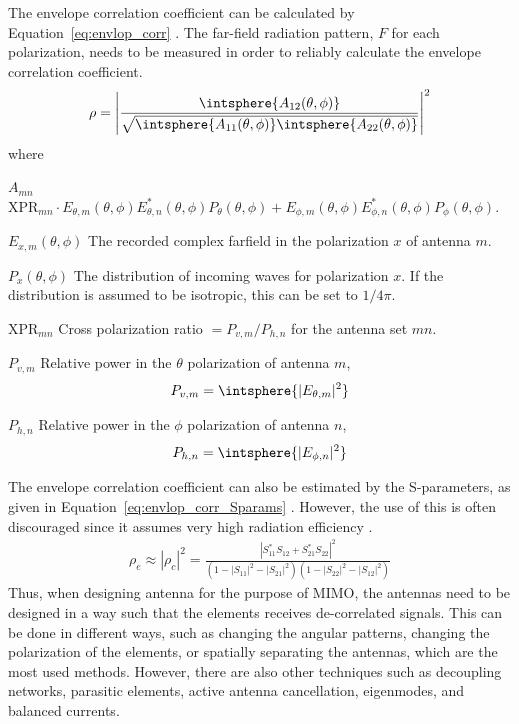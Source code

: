 The envelope correlation coefficient can be calculated by Equation~\ref{eq:envlop_corr} \cite{Wang2010}. The far-field radiation pattern, $F$ for each polarization, needs to be measured in order to reliably calculate the envelope correlation coefficient.
\begin{align} %
\label{eq:envlop_corr}
\rho = 
\left|  
%
\frac
{\intsphere{A_{12}(\theta,\phi)}}
{\sqrt{\intsphere{A_{11}(\theta,\phi)} \intsphere{A_{22}(\theta,\phi)}}}
%
\right|^2
\end{align}
where
\def\xpr{\text{XPR}}
\begin{where}
\item[$A_{mn}$]
    $
    \xpr_{mn} \cdot E_{\theta,m}(\theta,\phi) E^*_{\theta,n}(\theta,\phi) P_{\theta}(\theta,\phi)
    +
    E_{\phi,m}(\theta,\phi)E^*_{\phi,n}(\theta,\phi)P_{\phi}(\theta,\phi)
    $.
\item[$E_{x,m}(\theta,\phi)$] The recorded complex farfield in the polarization $x$ of antenna $m$.
\item[$P_x(\theta,\phi)$] The distribution of incoming waves for polarization $x$. If the distribution is assumed to be isotropic, this can be set to $1/4\pi$.
\item[$\xpr_{mn}$] Cross polarization ratio $= P_{v,m}/P_{h,n}$ for the antenna set $mn$.
\item[$P_{v,m}$] Relative power in the $\theta$ polarization of antenna $m$, 
    \begin{equation*}
        P_{v,m} = \intsphere{|E_{\theta,m}|^2}
    \end{equation*}
\item[$P_{h,n}$] Relative power in the $\phi$ polarization of antenna $n$,
    \begin{equation*}
        P_{h,n} = \intsphere{|E_{\phi,n}|^2}
    \end{equation*}
\end{where}

The envelope correlation coefficient can also be estimated by the S-parameters, as given in Equation~\ref{eq:envlop_corr_Sparams} \cite{Alain2010MIMO}. However, the use of this is often discouraged since it assumes very high radiation efficiency \cite{Alain2010MIMO}.
\begin{align} %
\label{eq:envlop_corr_Sparams}
  \rho_e \approx |\rho_c|^2 = \frac{|S^*_{11}S_{12}+S^*_{21}S_{22}|^2}{(1-|S_{11}|^2-|S_{21}|^2)(1-|S_{22}|^2-|S_{12}|^2)}
\end{align}
Thus, when designing antenna for the purpose of MIMO, the antennas need to be designed in a way such that the elements receives de-correlated signals. This can be done in different ways, such as changing the angular patterns, changing the polarization of the elements, or spatially separating the antennas, which are the most used methods. However, there are also other techniques such as decoupling networks, parasitic elements, active antenna cancellation, eigenmodes, and balanced currents. 


